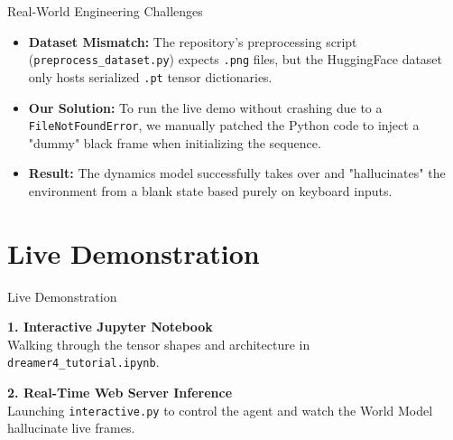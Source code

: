 \documentclass[aspectratio=169]{beamer}
\begin{document}
\begin{frame}{Real-World Engineering Challenges}
    \begin{itemize}
        \item \textbf{Dataset Mismatch:} The repository's preprocessing script (\texttt{preprocess\_dataset.py}) expects \texttt{.png} files, but the HuggingFace dataset only hosts serialized \texttt{.pt} tensor dictionaries.
        \item \textbf{Our Solution:} To run the live demo without crashing due to a \texttt{FileNotFoundError}, we manually patched the Python code to inject a "dummy" black frame when initializing the sequence. 
        \item \textbf{Result:} The dynamics model successfully takes over and "hallucinates" the environment from a blank state based purely on keyboard inputs.
    \end{itemize}
\end{frame}

\section{Live Demonstration}

\begin{frame}{Live Demonstration}
    \begin{center}
        \Large \textbf{1. Interactive Jupyter Notebook} \\
        \normalsize Walking through the tensor shapes and architecture in \texttt{dreamer4\_tutorial.ipynb}.
        
        \vspace{0.8cm}
        
        \Large \textbf{2. Real-Time Web Server Inference} \\
        \normalsize Launching \texttt{interactive.py} to control the agent and watch the World Model hallucinate live frames.
    \end{center}
\end{frame}
\end{document}
